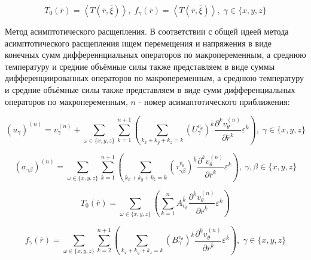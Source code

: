 \begin{equation}
    \label{elhp:eq22}
    T_0 \left( \overline{r}  \right) = \left< T \left( \overline{r} , \overline{\xi}  \right)  \right> 
    ,\;
    f_{\gamma} \left( \overline{r}  \right) = \left< T \left( \overline{r} , \overline{\xi}  \right)  \right> 
    ,\;
    \gamma \in \{x,y,z\} 
\end{equation}

Метод асимптотического расщепления. В соответствии с общей идеей метода асимптотического расщепления ищем перемещения и напряжения в виде
конечных сумм дифференнциальных операторов по макропеременным, а среднюю температуру и средние объёмные силы также представляем в виде суммы 
дифференциированных операторов по макропеременным, а среднюю температуру и средние объёмные силы также представляем в виде сумм дифференциальных 
операторов по макропеременным, 
$n$
- номер асимаптотического приближения:

\begin{equation}
    \label{elhp:eq23}
    \left( u_{\gamma} \right)^{(n)} =
    v_{\gamma}^{(n)} +
    \sum_{ \omega \in \{x,y,z\} } \sum_{k=1}^{n+1}
    \left( 
    \sum_{k_x+k_y+k_z = k} 
    \left( U_{\gamma}^{v_{\theta}} \right)^{ \overline{k} } 
    \frac{\partial^k v_{\theta}^{(n)}}{\partial \overline{r}^{ \overline{k}  } } 
    \varepsilon^k
\right) 
,\;
\gamma \in \{x,y,z\} 
\end{equation}

\begin{equation}
    \label{elhp:eq24}
    \left( \sigma_{\gamma\beta} \right)^{(n)} =
    \sum_{ \omega \in \{x,y,z\} } \sum_{k=1}^{n+1}
    \left( 
    \sum_{k_x+k_y+k_z = k} 
    \left( \tau_{ \gamma\beta}^{v_{\theta}} \right)^{ \overline{k} }
    \frac{\partial^k v_{\theta}^{(n)}}{\partial \overline{r}^{ \overline{k}  } } 
    \varepsilon^k
    \right) 
,\;
    \gamma,\beta \in \{x,y,z\} 
\end{equation}

\begin{equation}
    \label{elhp:eq25}
    T_0 \left( \overline{r}  \right) =
    \sum_{ \omega \in \{x,y,z\} } 
    \left( 
        \sum_{k=1}^{n}
        A_{v_{\theta}}^{ \overline{k} }
        \frac{\partial^k v_{\theta}^{(n)}}{\partial \overline{r}^{ \overline{k}  } } 
        \varepsilon^k
    \right) 
\end{equation}

\begin{equation}
    \label{elhp:eq26}
    f_{ \gamma} \left( \overline{r}  \right) =
    \sum_{ \omega \in \{x,y,z\} } \sum_{k=2}^{n+1}
    \left( 
    \sum_{k_x+k_y+k_z = k} 
    \left( B_{\gamma}^{v_{\theta}} \right)^{ \overline{k} } 
    \frac{\partial^k v_{\theta}^{(n)}}{\partial \overline{r}^{ \overline{k}  } } 
    \varepsilon^k
\right) 
,\;
\gamma \in \{x,y,z\} 
\end{equation}



